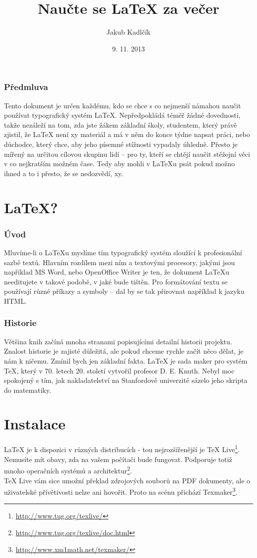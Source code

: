 \documentclass[10pt,a4paper]{article}
\title{Naučte se \LaTeX{} za večer}
\author{Jakub Kadlčík}
\date{9. 11. 2013}
\begin{document}
	\maketitle
	\newpage

	\section*{Předmluva}
	Tento dokument je určen každému, kdo se chce s co nejmenší námahou naučit používat typografický systém LaTeX. Nepředpokládá téměř žádné dovednosti, takže nezáleží na tom, zda jste žákem základní školy, studentem, který právě zjistil, že LaTeX není xy materiál a má v něm do konce týdne napsat práci, nebo důchodce, který chce, aby jeho písemné stížnosti vypadaly úhledně.
	Přesto je mířený na určitou cílovou skupinu lidí -- pro ty, kteří se chtějí naučit stěžejní věci v co nejkratším možném čase. Tedy aby mohli v LaTeXu psát pokud možno ihned a to i přesto, že se nedozvědí, xy.

	\newpage
	\tableofcontents
	\newpage

    \part{LaTeX?}
		\section{Úvod}
		Mluvíme-li o LaTeXu myslíme tím typografický systém sloužící k profesionální sazbě textů. Hlavním rozdílem mezi ním a textovými procesory, jakými jsou například MS Word, nebo OpenOffice Writer je ten, že dokument LaTeXu needitujete v takové podobě, v jaké bude tištěn. Pro formátování textu se používají různé příkazy a symboly -- dal by se tak přirovnat například k jazyku HTML.

		\section{Historie}
		Většina knih začíná mnoha stranami popisujícími detailní historii projektu. Znalost historie je zajisté důležitá, ale pokud chceme rychle začít něco dělat, je nám k ničemu. Zmínil bych jen základní fakta. LaTeX je sada maker pro systém TeX, který v 70. letech 20. století vytvořil profesor D. E. Knuth. Nebyl moc spokojený s tím, jak nakladatelství na  Stanfordově univerzitě sázelo jeho skripta do matematiky.

	\newpage
	\part{Instalace}
		LaTeX je k dispozici v různých distribucích - tou nejrozšířenější je TeX Live\footnote{\url{http://www.tug.org/texlive/}}. Nemusíte mít obavy, zda na vašem počítači bude fungovat. Podporuje totiž mnoho operačních systémů a architektur\footnote{\url{http://www.tug.org/texlive/doc.html}}.
		\\
		TeX Live vám sice umožní překlad zdrojových souborů na PDF dokumenty, ale o uživatelské přívětivosti nelze ani hovořit. Proto na scénu přichází Texmaker\footnote{\url{http://www.xm1math.net/texmaker/}}.
\end{document}
